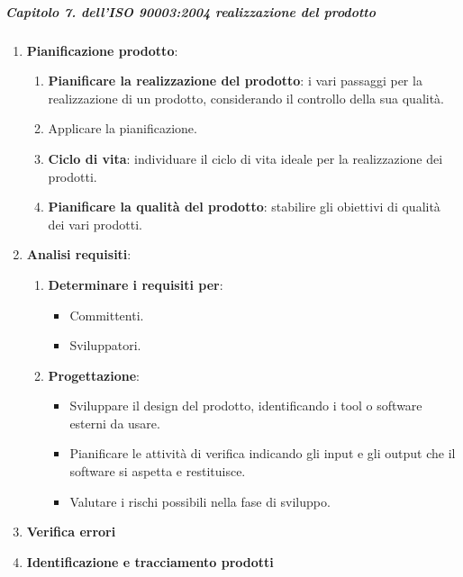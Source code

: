     \subparagraph{Capitolo 7. dell'ISO 90003:2004 realizzazione del prodotto}

    \begin{enumerate}
        \item \textbf{Pianificazione prodotto}:
            \begin{enumerate}
                \item \textbf{Pianificare la realizzazione del prodotto}: i vari passaggi per la realizzazione di un prodotto, considerando il controllo della sua qualità.
                \item Applicare la pianificazione.
                \item \textbf{Ciclo di vita}: individuare il ciclo di vita ideale per la realizzazione dei prodotti.
                \item \textbf{Pianificare la qualità del prodotto}: stabilire gli obiettivi di qualità dei vari prodotti.
            \end{enumerate}
        \item \textbf{Analisi requisiti}:
            \begin{enumerate}
                \item \textbf{Determinare i requisiti per}:
                    \begin{itemize}
                        \item Committenti.
                        \item Sviluppatori.
                    \end{itemize}
                \item \textbf{Progettazione}:
                    \begin{itemize}
                        \item Sviluppare il design del prodotto, identificando i tool o software esterni da usare.
                        \item Pianificare le attività di verifica indicando gli input e gli output che il software si aspetta e restituisce.
                        \item Valutare i rischi possibili nella fase di sviluppo.
                    \end{itemize}
            \end{enumerate}
        \item \textbf{Verifica errori}
        \item \textbf{Identificazione e tracciamento prodotti}
    \end{enumerate}

